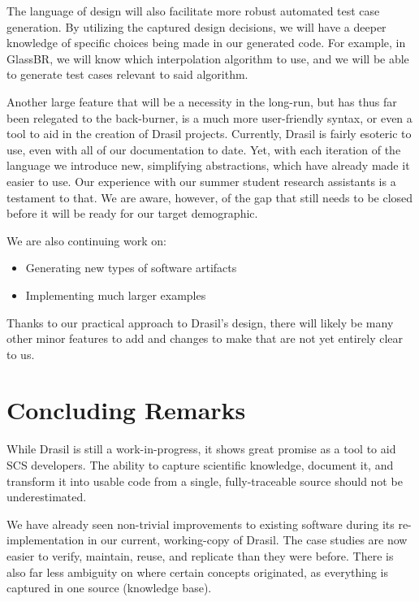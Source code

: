 \documentclass[sigconf]{acmart}
\newcommand{\authornt}[3]{\textcolor{#1}{[#3 ---#2]}}
\newcommand{\authornt}[3]{}
\newcommand{\spr}[1]{\authornt{green}{SP}{#1}} %
\begin{document}
{The language of design will also facilitate more robust automated test case 
generation. By utilizing the captured design decisions, we will have a deeper 
knowledge of specific choices being made in our generated code. For example, in 
GlassBR, we will know which interpolation algorithm to use, and we will be able 
to generate test cases relevant to said algorithm.


Another large feature that will be a necessity in the long-run, but has thus 
far been relegated to the back-burner, is a much more user-friendly syntax, or 
even a tool to aid in the creation of Drasil projects. Currently, Drasil is 
fairly esoteric to use, even with all of our documentation to date. Yet, with 
each iteration of the language we introduce new, simplifying abstractions, 
which have already made it easier to use. Our experience with our summer student 
research assistants is a testament to that. We are aware, however, of the gap 
that still needs to be closed before it will be ready for our target 
demographic.

We are also continuing work on:
\begin{itemize}
	\item Generating new types of software artifacts
	\item Implementing much larger examples
\end{itemize}

Thanks to our practical approach to Drasil's design, there will likely be many 
other minor features to add and changes to make that are not yet entirely clear 
to us.

\section{Concluding Remarks}

While Drasil is still a work-in-progress, it shows great promise as a tool to 
aid SCS developers. The ability to capture scientific knowledge, document it, 
and transform it into usable code from a single, fully-traceable source should 
not be underestimated.

We have already seen non-trivial improvements to existing software during its 
re-implementation in our current, working-copy of Drasil. The case studies are 
now easier to verify, maintain, reuse, and replicate than they were before. 
There is also far less ambiguity on where certain concepts originated, as 
everything is captured in one source (knowledge base).

}
\end{document}
